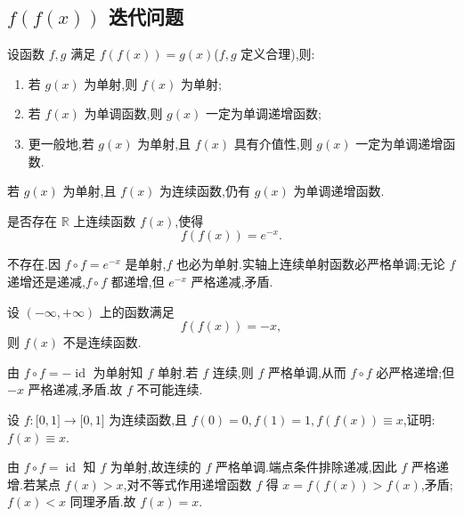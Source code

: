 \subsection{\texorpdfstring{$f(f(x))$}{f(f(x))} 迭代问题}

\begin{proposition}[\markstar]
    设函数 $f,g$ 满足 $f(f(x))=g(x)$($f,g$ 定义合理),则:
    \begin{enumerate}
        \item 若 $g(x)$ 为单射,则 $f(x)$ 为单射;
        \item 若 $f(x)$ 为单调函数,则 $g(x)$ 一定为单调递增函数;
        \item 更一般地,若 $g(x)$ 为单射,且 $f(x)$ 具有介值性,则 $g(x)$ 一定为单调递增函数.
    \end{enumerate}
\end{proposition}

\begin{corollary}[\markstar]
    若 $g(x)$ 为单射,且 $f(x)$ 为连续函数,仍有 $g(x)$ 为单调递增函数.
\end{corollary}

\begin{example}
    是否存在 $\mathbb{R}$ 上连续函数 $f(x)$,使得
    \[
        f(f(x))=e^{-x}.
    \]
\end{example}
\exampleblank

\begin{solution}
    不存在.因 $f\circ f=e^{-x}$ 是单射,$f$ 也必为单射.实轴上连续单射函数必严格单调;无论 $f$ 递增还是递减,$f\circ f$ 都递增,但 $e^{-x}$ 严格递减,矛盾.
\end{solution}

\begin{example}
    设 $(-\infty,+\infty)$ 上的函数满足
    \[
        f(f(x))=-x,
    \]
    则 $f(x)$ 不是连续函数.
\end{example}
\exampleblank

\begin{solution}
    由 $f\circ f=-\operatorname{id}$ 为单射知 $f$ 单射.若 $f$ 连续,则 $f$ 严格单调,从而 $f\circ f$ 必严格递增;但 $-x$ 严格递减,矛盾.故 $f$ 不可能连续.
\end{solution}

\begin{example}
    设 $f:\lbrack 0,1\rbrack\to\lbrack 0,1\rbrack$ 为连续函数,且 $f(0)=0,f(1)=1,f(f(x))\equiv x$,证明:$f(x)\equiv x$.
\end{example}
\exampleblank

\begin{solution}
    由 $f\circ f=\operatorname{id}$ 知 $f$ 为单射,故连续的 $f$ 严格单调.端点条件排除递减,因此 $f$ 严格递增.若某点 $f(x)>x$,对不等式作用递增函数 $f$ 得 $x=f(f(x))>f(x)$,矛盾;$f(x)<x$ 同理矛盾.故 $f(x)=x$.
\end{solution}

